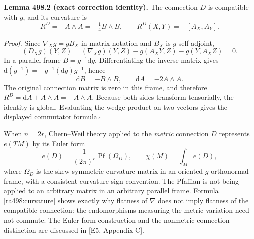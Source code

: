\documentclass[11pt]{article}
\begin{document}
\textbf{Lemma 498.2 (exact correction identity).}
The connection $D$ is compatible with $g$, and its curvature is
\begin{equation}\label{ra498:curvature}
 R^D=-A\wedge A=-\tfrac14B\wedge B,
 \qquad
 R^D(X,Y)=-[A_X,A_Y].
\end{equation}

\emph{Proof.}
Since $\nabla_Xg=gB_X$ in matrix notation and $B_X$ is $g$-self-adjoint,
\[
 (D_Xg)(Y,Z)=(\nabla_Xg)(Y,Z)
              -g(A_XY,Z)-g(Y,A_XZ)=0.
\]
In a parallel frame $B=g^{-1}\mathrm dg$. Differentiating the inverse
matrix gives $\mathrm d(g^{-1})=-g^{-1}(\mathrm dg)g^{-1}$, hence
\[
 \mathrm dB=-B\wedge B,
 \qquad \mathrm dA=-2A\wedge A.
\]
The original connection matrix is zero in this frame, and therefore
$R^D=\mathrm dA+A\wedge A=-A\wedge A$. Because both sides transform
tensorially, the identity is global. Evaluating the wedge product on two
vectors gives the displayed commutator formula.\hfill$\square$

When $n=2r$, Chern--Weil theory applied to the \emph{metric} connection $D$
represents $e(TM)$ by its Euler form
\begin{equation}\label{ra498:euler}
 e(D)=\frac{1}{(2\pi)^r}\operatorname{Pf}(\Omega_D),
 \qquad \chi(M)=\int_M e(D),
\end{equation}
where $\Omega_D$ is the skew-symmetric curvature matrix in an oriented
$g$-orthonormal frame, with a consistent curvature sign convention.
The Pfaffian is not being applied to an arbitrary matrix in an arbitrary
parallel frame. Formula \eqref{ra498:curvature} shows exactly why flatness
of $\nabla$ does not imply flatness of the compatible connection: the
endomorphisms measuring the metric variation need not commute.
The Euler-form construction and the nonmetric-connection distinction are
discussed in [E5, Appendix C].
\end{document}
